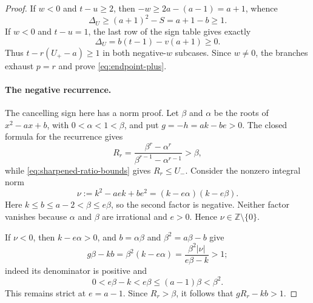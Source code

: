 \begin{proof}
If $w<0$ and $t-u\ge2$, then $-w\ge2a-(a-1)=a+1$, whence
\[
\Delta_U\ge(a+1)^2-S=a+1-b\ge1.
\]
If $w<0$ and $t-u=1$, the last row of the sign table gives exactly
\[
\Delta_U=b(t-1)-v(a+1)\ge0.
\]
Thus $t-r(U_+-a)\ge1$ in both negative-$w$ subcases.  Since $w\ne0$,
the branches exhaust $p=r$ and prove \eqref{eq:endpoint-plus}.

\paragraph{The negative recurrence.}
The cancelling sign here has a norm proof.  Let $\beta$ and $\alpha$ be the
roots of $x^2-ax+b$, with $0<\alpha<1<\beta$, and put
$g=-h=ak-be>0$.  The closed formula for the recurrence gives
\[
R_r=\frac{\beta^r-\alpha^r}{\beta^{r-1}-\alpha^{r-1}}>\beta,
\]
while \eqref{eq:sharpened-ratio-bounds} gives $R_r\le U_-$.  Consider the
nonzero integral norm
\[
\nu:=k^2-aek+be^2=(k-e\alpha)(k-e\beta).
\]
Here $k\le b\le a-2<\beta\le e\beta$, so the second factor is negative.
Neither factor vanishes because $\alpha$ and $\beta$ are irrational and
$e>0$.  Hence $\nu\in\mathbb Z\setminus\{0\}$.

If $\nu<0$, then $k-e\alpha>0$, and $b=\alpha\beta$ and
$\beta^2=a\beta-b$ give
\[
g\beta-kb=\beta^2(k-e\alpha)
=\frac{\beta^2|\nu|}{e\beta-k}>1;
\]
indeed its denominator is positive and
\[
0<e\beta-k<e\beta\le(a-1)\beta<\beta^2.
\]
This remains strict at $e=a-1$.  Since $R_r>\beta$, it follows that
$gR_r-kb>1$.


\end{proof}
